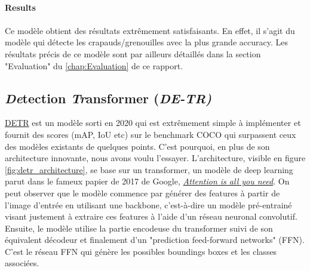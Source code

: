 \paragraph{Results}

\paragraph{} Ce modèle obtient des résultats extrêmement satisfaisants. En effet, il s'agit du modèle qui détecte les crapauds/grenouilles avec la plus grande accuracy. Les résultats précis de ce modèle sont par ailleurs détaillés dans la section "Evaluation" du \autoref{chap:Evaluation} de ce rapport.

\subsection{\textit{De}tection \textit{Tr}ansformer (\textit{DE-TR)}}

\href{https://github.com/facebookresearch/detr}{DETR} est un modèle sorti en 2020 qui est extrêmement simple à implémenter et fournit des scores (mAP, IoU etc) sur le benchmark COCO qui surpassent ceux des modèles existants de quelques points. C’est pourquoi, en plus de son architecture innovante, nous avons voulu l’essayer. L’architecture, visible en figure \ref{fig:detr_architecture}, se base sur un transformer, un modèle de deep learning parut dans le fameux papier de 2017 de Google, \href{https://arxiv.org/pdf/1706.03762.pdf}{\textit{Attention is all you need}}. On peut observer que le modèle commence par générer des features à partir de l'image d'entrée en utilisant une backbone, c'est-à-dire un modèle pré-entrainé visant justement à extraire ces features à l'aide d'un réseau neuronal convolutif. Ensuite, le modèle utilise la partie encodeuse du transformer suivi de son équivalent décodeur et finalement d'un "prediction feed-forward networks" (FFN). C'est le réseau FFN qui génère les possibles boundings boxes et les classes associées.

